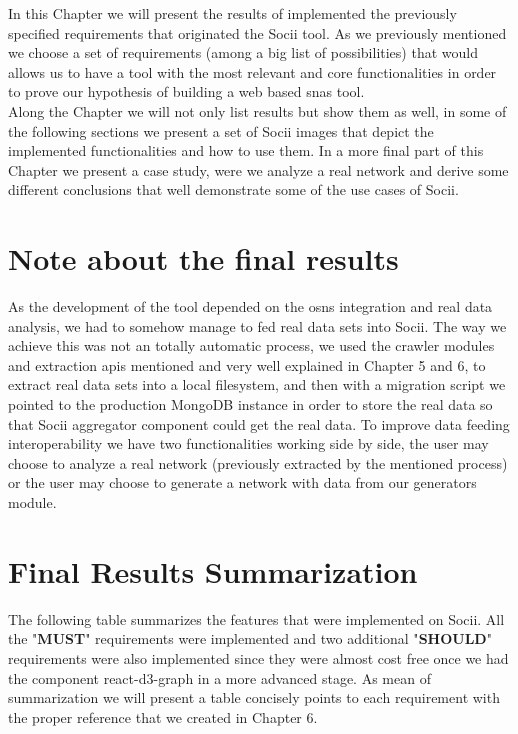 In this Chapter we will present the results of implemented the previously specified requirements that originated the Socii tool. As we previously mentioned we
choose a set of requirements (among a big list of possibilities) that would allows us to have a tool with the most relevant and core functionalities
in order to prove our hypothesis of building a web based \glspl{sna} tool.\\
\indent Along the Chapter we will not only list results but show them as well, in some of the following sections we present a set of Socii images that depict the implemented functionalities and how to use them. In a more final part of this Chapter we present a case study, were we analyze a real network and derive some different conclusions that well demonstrate some of the use cases of Socii.

\section{Note about the final results}

As the development of the tool depended on the \glspl{osn} integration and real data analysis, we had to somehow manage to fed real data sets into
Socii. The way we achieve this was not an totally automatic process, we used the crawler modules and extraction \glspl{api} mentioned and very well explained in Chapter 5 and 6, to extract real data sets into a local filesystem, and then with a migration script we pointed to the production MongoDB instance in order to store the real data so that Socii aggregator component could get the real data. To improve data feeding interoperability we have two functionalities working side by side, the user may choose to analyze a real network (previously extracted by the mentioned process) or the user may choose to generate a network with data from our generators module.


\section{Final Results Summarization}

The following table summarizes the features that were implemented on Socii. All the "\textbf{MUST}" requirements were implemented
and two additional "\textbf{SHOULD}" requirements were also implemented since they were almost cost free once we had the
component react-d3-graph in a more advanced stage. As mean of summarization we will present a table concisely points to
each requirement with the proper reference that we created in Chapter 6.

